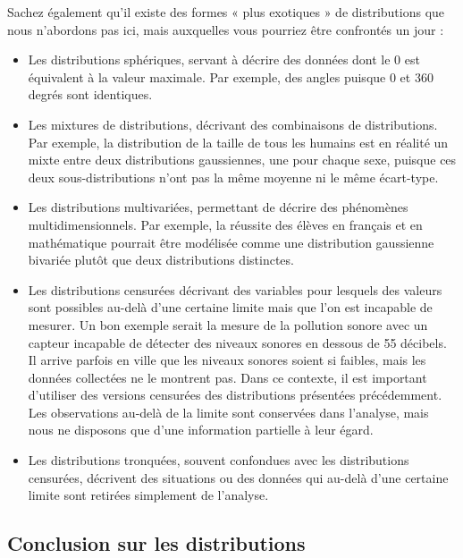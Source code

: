 \documentclass[
  11pt,
  french,
]{book}
\providecommand{\tightlist}{%
  \setlength{\itemsep}{0pt}\setlength{\parskip}{0pt}}
\begin{document}
Sachez également qu'il existe des formes « plus exotiques » de distributions que nous n'abordons pas ici, mais auxquelles vous pourriez être confrontés un jour :

\begin{itemize}
\tightlist
\item
  Les distributions sphériques, servant à décrire des données dont le 0 est équivalent à la valeur maximale. Par exemple, des angles puisque 0 et 360 degrés sont identiques.
\item
  Les mixtures de distributions, décrivant des combinaisons de distributions. Par exemple, la distribution de la taille de tous les humains est en réalité un mixte entre deux distributions gaussiennes, une pour chaque sexe, puisque ces deux sous-distributions n'ont pas la même moyenne ni le même écart-type.
\item
  Les distributions multivariées, permettant de décrire des phénomènes multidimensionnels. Par exemple, la réussite des élèves en français et en mathématique pourrait être modélisée comme une distribution gaussienne bivariée plutôt que deux distributions distinctes.
\item
  Les distributions censurées décrivant des variables pour lesquels des valeurs sont possibles au-delà d'une certaine limite mais que l'on est incapable de mesurer. Un bon exemple serait la mesure de la pollution sonore avec un capteur incapable de détecter des niveaux sonores en dessous de 55 décibels. Il arrive parfois en ville que les niveaux sonores soient si faibles, mais les données collectées ne le montrent pas. Dans ce contexte, il est important d'utiliser des versions censurées des distributions présentées précédemment. Les observations au-delà de la limite sont conservées dans l'analyse, mais nous ne disposons que d'une information partielle à leur égard.
\item
  Les distributions tronquées, souvent confondues avec les distributions censurées, décrivent des situations ou des données qui au-delà d'une certaine limite sont retirées simplement de l'analyse.
\end{itemize}

\hypertarget{conclusion-sur-les-distributions}{%
\subsection{Conclusion sur les distributions}\label{conclusion-sur-les-distributions}}
\end{document}
